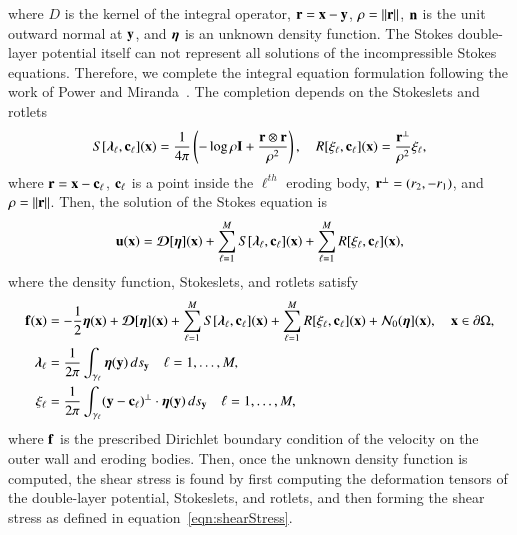 \documentclass[preprint, 10pt]{elsarticle}
\begin{document}
where $D$ is the kernel of the integral operator, ${\mathbf{r}} = {\mathbf{x}} - {\mathbf{y}}$,
$\rho = \|{\mathbf{r}}\|$, ${\mathbf{n}}$ is the unit outward normal at ${\mathbf{y}}$, and ${\boldsymbol\eta}$
is an unknown density function.  The Stokes double-layer potential
itself can not represent all solutions of the incompressible Stokes
equations.  Therefore, we complete the integral equation formulation
following the work of Power and Miranda~\cite{pow-mir1987}.  The
completion depends on the Stokeslets and rotlets
\begin{align}
  S[{\boldsymbol\lambda}_\ell,{\mathbf{c}}_\ell]({\mathbf{x}}) = \frac{1}{4\pi} \left( 
    -\log \rho {\mathbf{I}} + \frac{{\mathbf{r}} \otimes {\mathbf{r}}}{\rho^2} \right), \quad
  R[\xi_\ell,{\mathbf{c}}_\ell]({\mathbf{x}}) = \frac{{\mathbf{r}}^\perp}{\rho^2} \xi_\ell,
\end{align}
where ${\mathbf{r}} = {\mathbf{x}} - {\mathbf{c}}_\ell$, ${\mathbf{c}}_\ell$ is a point inside the
$\ell^{th}$ eroding body, ${\mathbf{r}}^\perp = (r_2,-r_1)$, and $\rho =
\|{\mathbf{r}}\|$.  Then, the solution of the Stokes equation is
\begin{align}
  {\mathbf{u}}({\mathbf{x}}) = {\boldsymbol{\mathcal D}}[{\boldsymbol\eta}]({\mathbf{x}}) + 
    \sum_{\ell=1}^M S[{\boldsymbol\lambda}_\ell,{\mathbf{c}}_\ell]({\mathbf{x}}) + 
    \sum_{\ell=1}^M R[\xi_\ell,{\mathbf{c}}_\ell]({\mathbf{x}}),
\end{align}
where the density function, Stokeslets, and rotlets satisfy
\begin{align}
  {\mathbf{f}}({\mathbf{x}}) &= -\frac{1}{2}{\boldsymbol\eta}({\mathbf{x}}) + {\boldsymbol{\mathcal D}}[{\boldsymbol\eta}]({\mathbf{x}}) + 
    \sum_{\ell=1}^M S[{\boldsymbol\lambda}_\ell,{\mathbf{c}}_\ell]({\mathbf{x}}) + 
    \sum_{\ell=1}^M R[\xi_\ell,{\mathbf{c}}_\ell]({\mathbf{x}}) +
    {\mathcal{N}}_0({\boldsymbol\eta}]({\mathbf{x}}), \quad {\mathbf{x}} \in {\partial}\Omega, \\
  {\boldsymbol\lambda}_\ell &= \frac{1}{2\pi} \int_{\gamma_\ell} 
    {\boldsymbol\eta}({\mathbf{y}})\, ds_{\mathbf{y}} \quad \ell = 1,\ldots,M, \\
  \xi_\ell &= \frac{1}{2\pi} \int_{\gamma_\ell}
    ({\mathbf{y}} - {\mathbf{c}}_\ell)^\perp \cdot {\boldsymbol\eta}({\mathbf{y}})\, ds_{\mathbf{y}} 
    \quad \ell = 1,\ldots,M,
\end{align}
where ${\mathbf{f}}$ is the prescribed Dirichlet boundary condition of the
velocity on the outer wall and eroding bodies.  Then, once the unknown
density function is computed, the shear stress is found by first
computing the deformation tensors of the double-layer potential,
Stokeslets, and rotlets, and then forming the shear stress as defined in
equation~\eqref{eqn:shearStress}.


\end{document}
